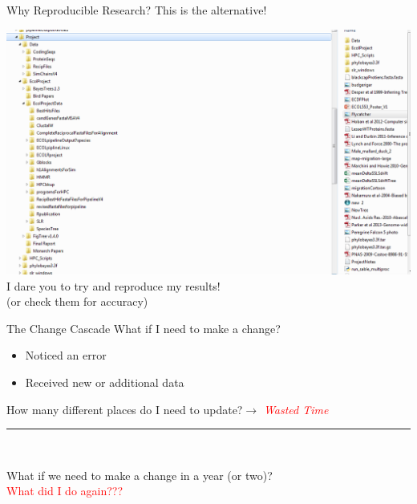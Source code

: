 \documentclass{beamer}\usepackage[]{graphicx}\usepackage[]{color}
\begin{document}
\begin{frame}{Why Reproducible Research?}
This is the alternative!

\includegraphics[scale=.25]{./Figures/FolderMess.png}\\
\pause
I dare you to try and reproduce my results!\\
(or check them for accuracy)\\
\end{frame}

\begin{frame}{The Change Cascade}
What if I need to make a change?\\
\pause

\begin{itemize}
\item Noticed an error\\
\item Received new or additional data\\
\end{itemize}

\pause
\vspace{.5cm}
How many different places do I need to update?\pause $\rightarrow$ \textcolor{red}{\emph{Wasted Time}\\}

\pause
\begin{center}
\rule{8cm}{.5pt}\\
\end{center}
\vspace{.2cm}
What if we need to make a change in a year (or two)?\\

\pause
\vspace{0.5cm}
\textcolor{red}{What did I do again???}
\end{frame}
\end{document}
